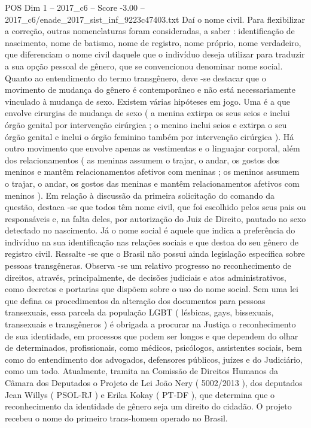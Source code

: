 \begin{textsample}{POS Dim 1 – 2017\_c6 – Score -3.00 – 2017\_c6/enade\_2017\_sist\_inf\_9223c47403.txt}
Daí o nome civil.
Para flexibilizar a correção, outras nomenclaturas foram consideradas, a saber : identificação de nascimento, nome de batismo, nome de registro, nome próprio, nome verdadeiro, que diferenciam o nome civil daquele que o indivíduo deseja utilizar para traduzir a sua opção pessoal de gênero, que se convencionou denominar nome social.
Quanto ao entendimento do termo transgênero, deve -se destacar que o movimento de mudança do gênero é contemporâneo e não está necessariamente vinculado à mudança de sexo.
Existem várias hipóteses em jogo.
Uma é a que envolve cirurgias de mudança de sexo ( a menina extirpa os seus seios e inclui órgão genital por intervenção cirúrgica ; o menino inclui seios e extirpa o seu órgão genital e inclui o órgão feminino também por intervenção cirúrgica ).
Há outro movimento que envolve apenas as vestimentas e o linguajar corporal, além dos relacionamentos ( as meninas assumem o trajar, o andar, os gostos dos meninos e mantêm relacionamentos afetivos com meninas ; os meninos assumem o trajar, o andar, os gostos das meninas e mantêm relacionamentos afetivos com meninos ).
Em relação à discussão da primeira solicitação do comando da questão, destaca -se que todos têm nome civil, que foi escolhido pelos seus pais ou responsáveis e, na falta deles, por autorização do Juiz de Direito, pautado no sexo detectado no nascimento.
Já o nome social é aquele que indica a preferência do indivíduo na sua identificação nas relações sociais e que destoa do seu gênero de registro civil.
Ressalte -se que o Brasil não possui ainda legislação específica sobre pessoas transgêneras.
Observa -se um relativo progresso no reconhecimento de direitos, através, principalmente, de decisões judiciais e atos administrativos, como decretos e portarias que dispõem sobre o uso do nome social.
Sem uma lei que defina os procedimentos da alteração dos documentos para pessoas transexuais, essa parcela da população LGBT ( lésbicas, gays, bissexuais, transexuais e transgêneros ) é obrigada a procurar na Justiça o reconhecimento de sua identidade, em processos que podem ser longos e que dependem do olhar de determinados, profissionais, como médicos, psicólogos, assistentes sociais, bem como do entendimento dos advogados, defensores públicos, juízes e do Judiciário, como um todo.
Atualmente, tramita na Comissão de Direitos Humanos da Câmara dos Deputados o Projeto de Lei João Nery ( 5002/2013 ), dos deputados Jean Willys ( PSOL-RJ ) e Erika Kokay ( PT-DF ), que determina que o reconhecimento da identidade de gênero seja um direito do cidadão.
O projeto recebeu o nome do primeiro trans-homem operado no Brasil.

\end{textsample}
